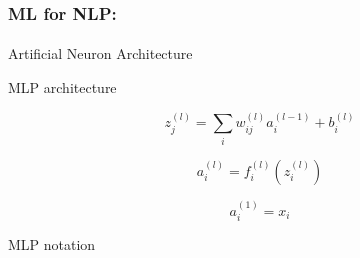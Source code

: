 \documentclass[xcolor=table]{beamer}
\begin{document}
	\begin{frame}
		\frametitle{ML for NLP: \insertsection}
		\framesubtitle{\insertsubsection}
		
		\begin{minipage}{0.39\textwidth}
			\centering 
			Artificial Neuron Architecture
			
		\end{minipage}
		\begin{minipage}{0.4\textwidth} 
			\centering
			MLP architecture
			
		\end{minipage}
		
		\begin{minipage}{0.39\textwidth}
			\[z_j^{(l)} = \sum_i w_{ij}^{(l)} a_{i}^{(l-1)} + b_{i}^{(l)}\]
			
			\[a_{i}^{(l)} = f_{i}^{(l)}(z_{i}^{(l)})\]
			
			\[a_{i}^{(1)} = x_{i}\]
		\end{minipage}
		\begin{minipage}{0.6\textwidth} 
			\centering
			MLP notation
			
		\end{minipage}
		
	\end{frame}
	
\end{document}

